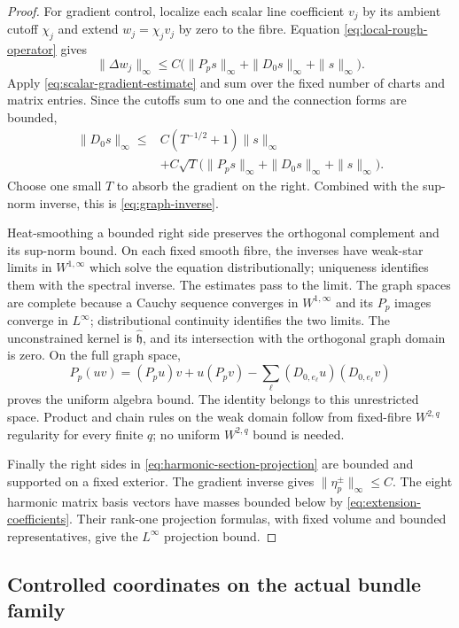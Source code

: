 \begin{proof}
For gradient control, localize each scalar line coefficient
$v_j$ by its ambient cutoff $\chi_j$ and extend
$w_j=\chi_jv_j$ by zero to the fibre. Equation
\eqref{eq:local-rough-operator} gives
\[
 \|\Delta w_j\|_\infty\le C\bigl(\|P_ps\|_\infty
                  +\|D_0s\|_\infty+\|s\|_\infty\bigr).
\]
Apply \eqref{eq:scalar-gradient-estimate} and sum over the
fixed number of charts and matrix entries. Since the
cutoffs sum to one and the connection forms are bounded,
\[
 \begin{split}
 \|D_0s\|_\infty\le{}&C(T^{-1/2}+1)\|s\|_\infty\\
 &+C\sqrt T\bigl(\|P_ps\|_\infty
                        +\|D_0s\|_\infty+\|s\|_\infty\bigr).
 \end{split}
\]
Choose one small $T$ to absorb the gradient on the right.
Combined with the sup-norm inverse, this is
\eqref{eq:graph-inverse}.

Heat-smoothing a bounded right side preserves the
orthogonal complement and its sup-norm bound. On each
fixed smooth fibre, the inverses have weak-star limits in
$W^{1,\infty}$ which solve the equation distributionally;
uniqueness identifies them with the spectral inverse.
The estimates pass to the limit. The graph spaces are
complete because a Cauchy sequence converges in
$W^{1,\infty}$ and its $P_p$ images converge in $L^\infty$;
distributional continuity identifies the two limits.
The unconstrained kernel is
$\widehat{\mathfrak h}$, and its intersection with the
orthogonal graph domain is zero. On the full graph space,
\begin{equation}\label{eq:graph-product}
 P_p(uv)=(P_pu)v+u(P_pv)
                   -\sum_\ell(D_{0,e_\ell}u)(D_{0,e_\ell}v)
\end{equation}
proves the uniform algebra bound. The identity belongs to
this unrestricted space. Product and chain rules on the
weak domain follow from fixed-fibre $W^{2,q}$ regularity
for every finite $q$; no uniform $W^{2,q}$ bound is needed.

Finally the right sides in
\eqref{eq:harmonic-section-projection} are bounded and
supported on a fixed exterior. The gradient inverse gives
$\|\eta_p^\pm\|_\infty\le C$. The eight harmonic matrix
basis vectors have masses bounded below by
\eqref{eq:extension-coefficients}. Their rank-one
projection formulas, with fixed volume and bounded
representatives, give the $L^\infty$ projection bound.
\end{proof}

\subsection{Controlled coordinates on the actual bundle family}

